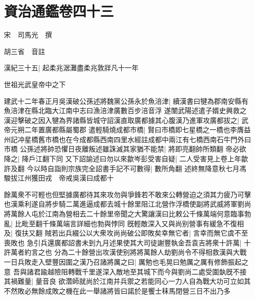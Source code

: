 \chapter{資治通鑑卷四十三}
宋　司馬光　撰

胡三省　音註

漢紀三十五|{
	起柔兆涺灘盡柔兆敦牂凡十一年}


世祖光武皇帝中之下

建武十二年春正月吳漢破公孫述將魏黨公孫永於魚涪津|{
	續漢書曰犍為郡南安縣有魚涪津在縣北臨大江南中志曰漁涪津廣數百步涪音浮}
遂闈武陽述遣子婿史興救之漢迎擊破之因入犍為界諸縣皆城守詔漢直取廣都據其心腹漢乃進軍攻廣都拔之|{
	武帝元朔二年置廣都縣屬蜀郡}
遣輕騎燒成都市橋|{
	賢曰市橋即七星橋之一橋也李膺益州記冲星橋舊市橋也在今成都縣西南四里水經註成都中兩江有七橋西南石牛門外曰市橋}
公孫述將帥恐懼日夜離叛述雖誅滅其家猶不能禁|{
	將即亮翻帥所類翻}
帝必欲降之|{
	降戶江翻下同}
又下詔諭述曰勿以來歙岑彭受害自疑|{
	二人受害見上卷上年歙許及翻}
今以時自詣則宗族完全詔書手記不可數得|{
	數所角翻}
述終無降意秋七月馮駿拔江州獲田戎　帝戒吳漢曰成都十

餘萬衆不可輕也但堅據廣都待其來攻勿與爭鋒若不敢來公轉營迫之須其力疲乃可擊也漢乘利遂自將步騎二萬進逼成都去城十餘里阻江北營作浮橋使副將武威將軍劉尚將萬餘人屯於江南為營相去二十餘里帝聞之大驚讓漢曰比敕公千條萬端何意臨事勃亂|{
	比毗至翻千條萬端言詳細也勃與悖同}
旣輕敵深入又與尚别營事有緩急不復相及|{
	復扶又翻}
賊若出兵綴公以大衆攻尚尚破公即敗矣幸無它者|{
	言幸而無它虞不至喪敗也}
急引兵還廣都詔書未到九月述果使其大司徒謝豐執金吾袁吉將衆十許萬|{
	十許萬者約言之也}
分為二十餘營出攻漢使别將將萬餘人劫劉尚令不得相救漢與大戰一日兵敗走入壁豐因圍之漢乃召諸將厲之曰|{
	厲勉也毛晃曰勉厲之厲有修飾振起之意}
吾與諸君踰越險阻轉戰千里遂深入敵地至其城下而今與劉尚二處受圍埶旣不接其禍難量|{
	量音良}
欲濳師就尚於江南并兵禦之若能同心一力人自為戰大功可立如其不然敗必無餘成敗之機在此一舉諸將皆曰諾於是饗士秣馬閉營三日不出乃多


